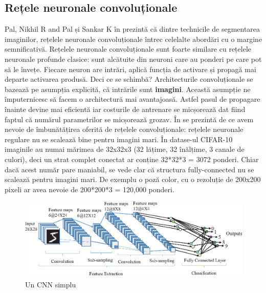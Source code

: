 \subsection{Rețele neuronale convoluționale}
Pal, Nikhil R and Pal și Sankar K în \cite{pal1993review} prezintă că dintre technicile de segmentarea imaginilor, rețelele neuronale convoluționale întrec celelalte abordări cu o margine semnificativă.\newline
Rețelele neuronale convoluționale sunt foarte similare cu rețelele neuronale profunde clasice: sunt alcătuite din neuroni care au ponderi pe care pot să le învețe. Fiecare neuron are intrări, aplică funcția de activare și propagă mai departe activarea produsă.\newline
Deci ce se schimbă? Architecturile convoluționale se bazează pe asumpția explicită, că intrările sunt \textbf{imagini}. Această asumpție ne împuternicesc să facem o architectură mai avantajoasă. Astfel pasul de propagare înainte devine mai eficientă iar costurile de antrenare se micșorează dat fiind faptul că numărul parametrilor se micșorează grozav.
În \cite{csfromuniversity} se prezintă de ce avem nevoie de îmbunătățirea oferită de rețelele convoluționale: rețelele neuronale regulare nu se scalează bine pentru imagini mari. În datase-ul CIFAR-10 imaginile au numai mărimea de 32x32x3 (32 lățime, 32 înălțime, 3 canale de culori), deci un strat complet conectat ar conține 32*32*3 = 3072 ponderi. Chiar dacă acest număr pare maniabil, se vede clar că structura fully-connected nu se scalează pentru imagini mari. De exemplu o poză color, cu o rezoluție de 200x200 pixeli ar avea nevoie de 200*200*3 = 120,000 ponderi.\newline

\begin{figure}[h!]
    	\centering
	\captionsetup{justification=centering, margin=2cm}
	\includegraphics[width=1.0\textwidth]{figures/cnn.png}
	\caption{Un CNN simplu \cite{Yakopcic2016MemristorCD}}
	\label{fig:selective_search}
\end{figure}

